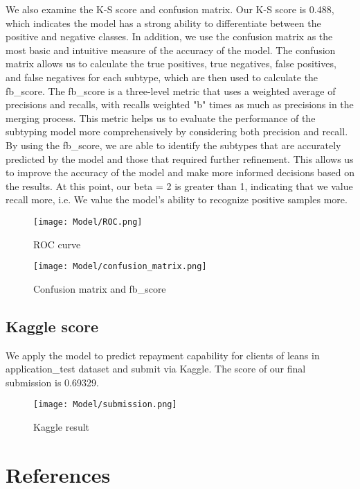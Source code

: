 \documentclass{article}
\begin{document}
We also examine the K-S score and confusion matrix. Our K-S score is 0.488, which indicates the model has a strong ability to differentiate between the positive and negative classes. In addition, we use the confusion matrix as the most basic and intuitive measure of the accuracy of the model. The confusion matrix allows us to calculate the true positives, true negatives, false positives, and false negatives for each subtype, which are then used to calculate the fb\_score. The fb\_score is a three-level metric that uses a weighted average of precisions and recalls, with recalls weighted "b" times as much as precisions in the merging process. This metric helps us to evaluate the performance of the subtyping model more comprehensively by considering both precision and recall. By using the fb\_score, we are able to identify the subtypes that are accurately predicted by the model and those that required further refinement. This allows us to improve the accuracy of the model and make more informed decisions based on the results. At this point, our beta = 2 is greater than 1, indicating that we value recall more, i.e. We value the model's ability to recognize positive samples more.


\begin{figure}[ht]
  \centering
  \begin{minipage}[b]{0.49\linewidth}
    \centering
    \texttt{[image: Model/ROC.png]} 
    \caption{ROC curve}
  \end{minipage}
  \hfill
  \begin{minipage}[b]{0.49\linewidth}
    \centering
    \texttt{[image: Model/confusion\_matrix.png]} 
    \caption{Confusion matrix and fb\_score}
  \end{minipage}
\end{figure}


\subsection{Kaggle score}
We apply the model to predict repayment capability for clients of leans in application\_test dataset and submit via Kaggle. The score of our final submission is 0.69329.
\begin{figure}[H]
  \centering
  \texttt{[image: Model/submission.png]}
  \caption{Kaggle result}
\end{figure}



\section*{References}
\end{document}
